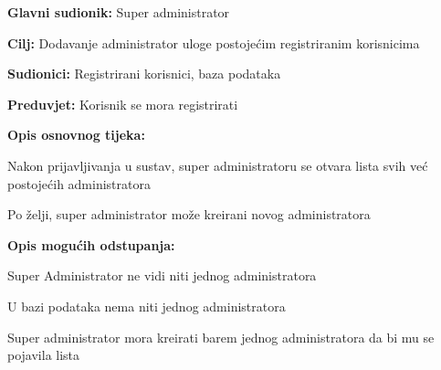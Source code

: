 				
				\noindent {}
				\begin{packed_item}
					
					\item \textbf{Glavni sudionik: } Super administrator
					\item  \textbf{Cilj:} Dodavanje administrator uloge postojećim registriranim korisnicima
					\item  \textbf{Sudionici:} Registrirani korisnici, baza podataka
					\item  \textbf{Preduvjet:} Korisnik se mora registrirati
					\item  \textbf{Opis osnovnog tijeka:}
					
					\item[] \begin{packed_enum}
						
						\item Nakon prijavljivanja u sustav, super administratoru se otvara lista svih već postojećih administratora
						\item Po želji, super administrator može kreirani novog administratora 
					\end{packed_enum}
					
					\item  \textbf{Opis mogućih odstupanja:}
					
					\item[] \begin{packed_item}
						
						\item[1.a] Super Administrator ne vidi niti jednog administratora
						\item[] \begin{packed_enum}
							
							\item U bazi podataka nema niti jednog administratora
							\item Super administrator mora kreirati barem jednog administratora da bi mu se pojavila lista 
							
						\end{packed_enum}
						
					\end{packed_item}
				\end{packed_item}
				
